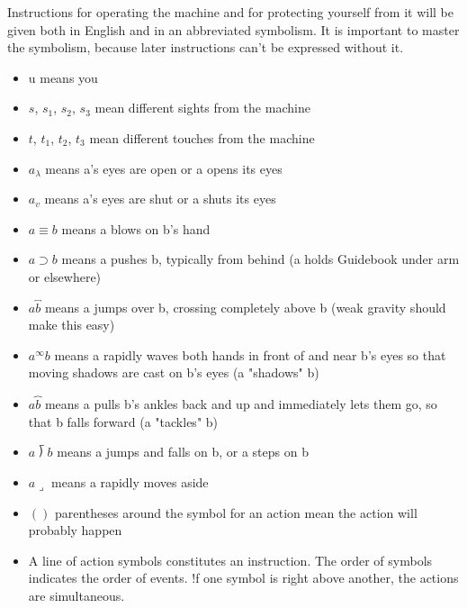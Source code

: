 \documentclass[10pt,twoside]{memoir}
\begin{document}
\begin{enumerate}
{\begin{enumerate}
\begin{sysrules}
\begin{sysrules}
\begin{sysrules}
\begin{sysrules}
{\begin{enumerate}
\begin{sysrules}
Instructions for operating the machine and for protecting yourself from 
it will be given both in English and in an abbreviated symbolism. It is 
important to master the symbolism, because later instructions can't be 
expressed without it. 

\begin{itemize}
\item u means you 

\item $s$, $s_1$, $s_2$, $s_3$ mean different sights from the machine 

\item $t$, $t_1$, $t_2$, $t_3$ mean different touches from the machine 

\item $a_\lambda$ means a's eyes are open or a opens its eyes 

\item $a_v$ means a's eyes are shut or a shuts its eyes 

\item $a\equiv b$ means a blows on b's hand 

\item $a\supset b$ means a pushes b, typically from behind 
(a holds Guidebook under arm or elsewhere) 

\item $a\overbracket{b}$ means a jumps over b, crossing completely above b (weak gravity 
should make this easy) 

\item $a^\infty b$ means a rapidly waves both hands in front of and near b's eyes so that 
moving shadows are cast on b's eyes (a "shadows" b) 

\item $a\overbrace{b}$ means a pulls b's ankles back and up and immediately lets them go, so 
that b falls forward (a "tackles" b) 

\item $a\longdivision{b}$ means a jumps and falls on b, or a steps on b 

\item $a\lrcorner$ means a rapidly moves aside 

\item $()$ parentheses around the symbol for an action mean the action will 
probably happen 

\item A line of action symbols constitutes an instruction. The order of symbols 
indicates the order of events. !f one symbol is right above another, the 
actions are simultaneous. 
\end{itemize}


\end{sysrules}
\end{enumerate}}
\end{sysrules}
\end{sysrules}
\end{sysrules}
\end{sysrules}
\end{enumerate}}
\end{enumerate}
\end{document}
